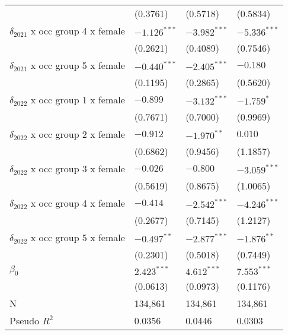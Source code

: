 \begin{tabular}{llll}
                                       &           (0.3761) &           (0.5718) &           (0.5834) \\
$\delta_{2021}$ x occ group 4 x female &     $-1.126^{***}$ &     $-3.982^{***}$ &     $-5.336^{***}$ \\
                                       &           (0.2621) &           (0.4089) &           (0.7546) \\
$\delta_{2021}$ x occ group 5 x female &     $-0.440^{***}$ &     $-2.405^{***}$ &           $-0.180$ \\
                                       &           (0.1195) &           (0.2865) &           (0.5620) \\
$\delta_{2022}$ x occ group 1 x female &           $-0.899$ &     $-3.132^{***}$ &         $-1.759^*$ \\
                                       &           (0.7671) &           (0.7000) &           (0.9969) \\
$\delta_{2022}$ x occ group 2 x female &           $-0.912$ &      $-1.970^{**}$ &            $0.010$ \\
                                       &           (0.6862) &           (0.9456) &           (1.1857) \\
$\delta_{2022}$ x occ group 3 x female &           $-0.026$ &           $-0.800$ &     $-3.059^{***}$ \\
                                       &           (0.5619) &           (0.8675) &           (1.0065) \\
$\delta_{2022}$ x occ group 4 x female &           $-0.414$ &     $-2.542^{***}$ &     $-4.246^{***}$ \\
                                       &           (0.2677) &           (0.7145) &           (1.2127) \\
$\delta_{2022}$ x occ group 5 x female &      $-0.497^{**}$ &     $-2.877^{***}$ &      $-1.876^{**}$ \\
                                       &           (0.2301) &           (0.5018) &           (0.7449) \\
$\beta_0$                              &      $2.423^{***}$ &      $4.612^{***}$ &      $7.553^{***}$ \\
                                       &           (0.0613) &           (0.0973) &           (0.1176) \\
N                                      &            134,861 &            134,861 &            134,861 \\
Pseudo $R^2$                           &             0.0356 &             0.0446 &             0.0303 \\
\bottomrule
\end{tabular}
